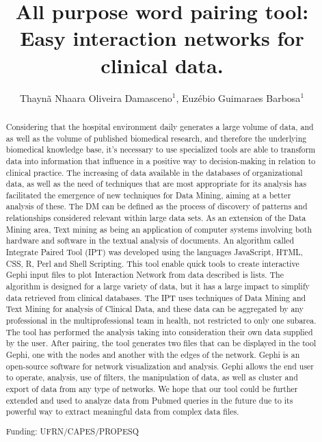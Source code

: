 \documentclass[twoside]{article}
\title{\vspace{-15mm}\fontsize{24pt}{10pt}\selectfont\textbf{All purpose word pairing tool: Easy interaction networks for clinical data.}} %
\author{Thayn\~a Nhaara Oliveira Damasceno$^1$, Euz\'ebio Guimaraes Barbosa$^1$}
\affil{1 UFRN\\ }
\date{}
\begin{document}
\maketitle %

\thispagestyle{fancy} %


\begin{abstract}
Considering that the hospital environment daily generates a large volume of data, and as well as the volume of published biomedical research, and therefore the underlying biomedical knowledge base, it's necessary to use specialized tools are able to transform data into information that influence in a positive way to decision-making in relation to clinical practice.
	The increasing of data available in the databases of organizational data, as well as the need of techniques that are most appropriate for its analysis has facilitated the emergence of new techniques for Data Mining, aiming at a better analysis of these. The DM can be defined as the process of discovery of patterns and relationships considered relevant within large data sets. As an extension of the Data Mining area, Text mining as being an application of computer systems involving both hardware and software in the textual analysis of documents. 
An algorithm called Integrate Paired Tool (IPT) was developed using the languages JavaScript, HTML, CSS, R, Perl and Shell Scripting. This tool enable quick tools to create interactive Gephi input files to plot Interaction Network from data described is lists. The algorithm is designed for a large variety of data, but it has a large impact to simplify data retrieved from clinical databases.  
	The IPT uses techniques of Data Mining and Text Mining for analysis of Clinical Data, and these data can be aggregated by any professional in the multiprofessional team in health, not restricted to only one subarea. The tool has performed the analysis taking into consideration their own data supplied by the user. 
After pairing, the tool generates two files that can be displayed in the tool Gephi, one with the nodes and another with the edges of the network. Gephi is an open-source software for network visualization and analysis. Gephi allows the end user to operate, analysis, use of filters, the manipulation of data, as well as cluster and export of data from any type of networks.
	We hope that our tool could be further extended and used to analyze data from Pubmed queries in the future due to its powerful way to extract meaningful data from complex data files.

Funding: UFRN/CAPES/PROPESQ
\end{abstract}
\end{document}
